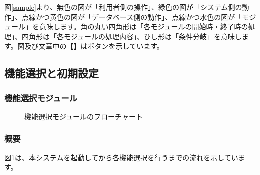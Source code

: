 \documentclass[a4j]{jarticle}
\begin{document}
図\ref{sample}より、無色の図が「利用者側の操作」、緑色の図が「システム側の動作」、点線かつ黄色の図が「データベース側の動作」、点線かつ水色の図が「モジュール」を意味します。角の丸い四角形は「各モジュールの開始時・終了時の処理」、四角形は「各モジュールの処理内容」、ひし形は「条件分岐」を意味します。図及び文章中の【】はボタンを示しています。

\subsection{機能選択と初期設定}
\subsubsection{機能選択モジュール\label{機能選択}}
\begin{figure}[H]
    \begin{center}
    \caption {機能選択モジュールのフローチャート}
    \label{functionselection}
    \end{center}
\end{figure}

\subsubsection*{概要}
図\ref{functionselection}は、本システムを起動してから各機能選択を行うまでの流れを示しています。
\end{document}
